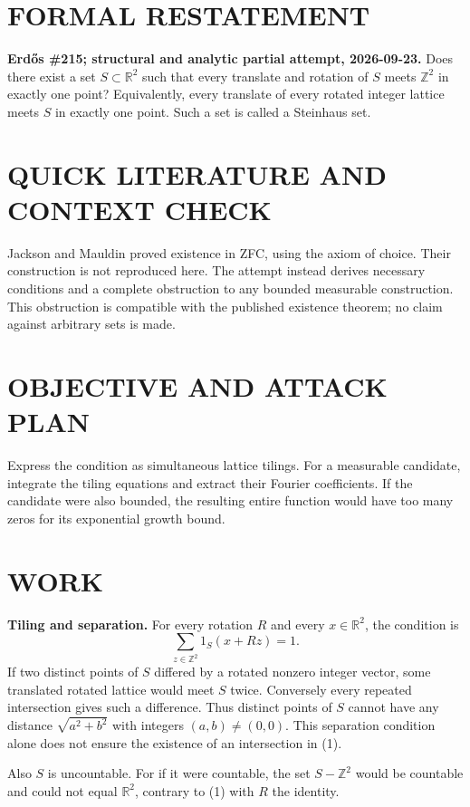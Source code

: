 \section{FORMAL RESTATEMENT}
\textbf{Erd\H{o}s \#215; structural and analytic partial attempt, 2026-09-23.}
Does there exist a set $S\subset\mathbb R^2$ such that every translate and rotation of $S$ meets $\mathbb Z^2$ in exactly one point? Equivalently, every translate of every rotated integer lattice meets $S$ in exactly one point. Such a set is called a Steinhaus set.

\section{QUICK LITERATURE AND CONTEXT CHECK}
Jackson and Mauldin proved existence in ZFC, using the axiom of choice. Their construction is not reproduced here. The attempt instead derives necessary conditions and a complete obstruction to any bounded measurable construction. This obstruction is compatible with the published existence theorem; no claim against arbitrary sets is made.

\section{OBJECTIVE AND ATTACK PLAN}
Express the condition as simultaneous lattice tilings. For a measurable candidate, integrate the tiling equations and extract their Fourier coefficients. If the candidate were also bounded, the resulting entire function would have too many zeros for its exponential growth bound.

\section{WORK}
\textbf{Tiling and separation.} For every rotation $R$ and every $x\in\mathbb R^2$, the condition is
\[
\sum_{z\in\mathbb Z^2}1_S(x+Rz)=1.
\tag{1}
\]
If two distinct points of $S$ differed by a rotated nonzero integer vector, some translated rotated lattice would meet $S$ twice. Conversely every repeated intersection gives such a difference. Thus distinct points of $S$ cannot have any distance $\sqrt{a^2+b^2}$ with integers $(a,b)\ne(0,0)$. This separation condition alone does not ensure the existence of an intersection in (1).

Also $S$ is uncountable. For if it were countable, the set $S-\mathbb Z^2$ would be countable and could not equal $\mathbb R^2$, contrary to (1) with $R$ the identity.

